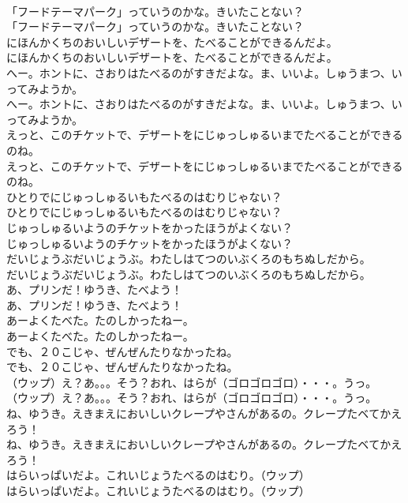\documentclass[8pt]{extreport}
\begin{document}
\begin{CJK}{UTF8}{min}
\\	「フードテーマパーク」っていうのかな。きいたことない？	
\\	「フードテーマパーク」っていうのかな。きいたことない？ 
\\	にほんかくちのおいしいデザートを、たべることができるんだよ。	
\\	にほんかくちのおいしいデザートを、たべることができるんだよ。 
\\	へー。ホントに、さおりはたべるのがすきだよな。ま、いいよ。しゅうまつ、いってみようか。	
\\	へー。ホントに、さおりはたべるのがすきだよな。ま、いいよ。しゅうまつ、いってみようか。 
\\	えっと、このチケットで、デザートをにじゅっしゅるいまでたべることができるのね。	
\\	えっと、このチケットで、デザートをにじゅっしゅるいまでたべることができるのね。 
\\	ひとりでにじゅっしゅるいもたべるのはむりじゃない？	
\\	ひとりでにじゅっしゅるいもたべるのはむりじゃない？ 
\\	じゅっしゅるいようのチケットをかったほうがよくない？	
\\	じゅっしゅるいようのチケットをかったほうがよくない？ 
\\	だいじょうぶだいじょうぶ。わたしはてつのいぶくろのもちぬしだから。	
\\	だいじょうぶだいじょうぶ。わたしはてつのいぶくろのもちぬしだから。 
\\	あ、プリンだ！ゆうき、たべよう！	
\\	あ、プリンだ！ゆうき、たべよう！ 
\\	あーよくたべた。たのしかったねー。	
\\	あーよくたべた。たのしかったねー。 
\\	でも、２０こじゃ、ぜんぜんたりなかったね。	
\\	でも、２０こじゃ、ぜんぜんたりなかったね。 
\\	（ウップ）え？あ。。。そう？おれ、はらが（ゴロゴロゴロ）・・・。うっ。	
\\	（ウップ）え？あ。。。そう？おれ、はらが（ゴロゴロゴロ）・・・。うっ。 
\\	ね、ゆうき。えきまえにおいしいクレープやさんがあるの。クレープたベてかえろう！	
\\	ね、ゆうき。えきまえにおいしいクレープやさんがあるの。クレープたベてかえろう！ 
\\	はらいっぱいだよ。これいじょうたべるのはむり。（ウップ）	
\\	はらいっぱいだよ。これいじょうたべるのはむり。（ウップ） 

\end{CJK}
\end{document}
